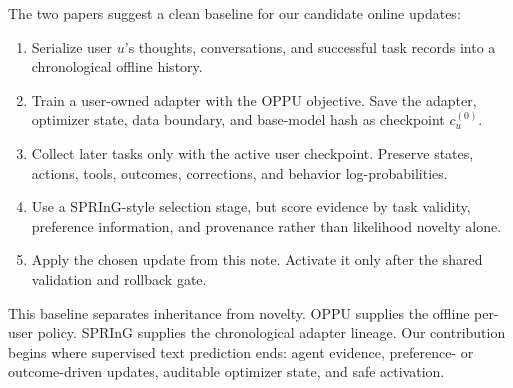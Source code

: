 The two papers suggest a clean baseline for our candidate online updates:
\begin{enumerate}
  \item Serialize user $u$'s thoughts, conversations, and successful task
  records into a chronological offline history.
  \item Train a user-owned adapter with the OPPU objective.  Save the adapter,
  optimizer state, data boundary, and base-model hash as checkpoint $c_u^{(0)}$.
  \item Collect later tasks only with the active user checkpoint.  Preserve
  states, actions, tools, outcomes, corrections, and behavior log-probabilities.
  \item Use a SPRInG-style selection stage, but score evidence by task
  validity, preference information, and provenance rather than likelihood
  novelty alone.
  \item Apply the chosen update from this note.  Activate it only after the
  shared validation and rollback gate.
\end{enumerate}

This baseline separates inheritance from novelty.  OPPU supplies the offline
per-user policy.  SPRInG supplies the chronological adapter lineage.  Our
contribution begins where supervised text prediction ends: agent evidence,
preference- or outcome-driven updates, auditable optimizer state, and safe
activation.
